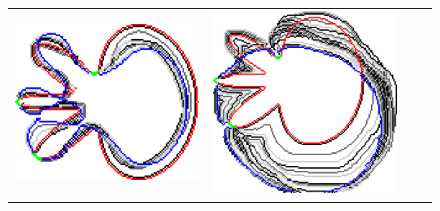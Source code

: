 \begin{figure}
\begin{tabular}{cccc}
\includegraphics[scale=0.2]{figures/chapter9/constrained-elastica/localsearch/flower-2/len_pen-0.0002/radius-7/nc-4/h1.0/summary.pdf} &
\includegraphics[scale=0.2]{figures/chapter9/constrained-elastica/localsearch/flower-2/len_pen-0.0002/radius-50/nc-4/h1.0/summary.pdf} &

\end{tabular}
\end{figure}
